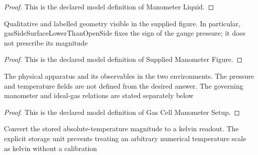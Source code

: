 \begin{proof}
  This is the declared model definition of Manometer Liquid.
\end{proof}
\begin{definition}
  \label{def:physics:phyx-mini-0365:phyxminiproblems-problemphyxmini0365-suppliedmanometerfigure}
  Qualitative and labelled geometry visible in the supplied figure. In particular, gasSideSurfaceLowerThanOpenSide fixes the sign of the gauge pressure; it does not prescribe its magnitude
\end{definition}
\begin{proof}
  This is the declared model definition of Supplied Manometer Figure.
\end{proof}
\begin{definition}
  \label{def:physics:phyx-mini-0365:phyxminiproblems-problemphyxmini0365-gascellmanometersetup}
  The physical apparatus and its observables in the two environments. The pressure and temperature fields are not defined from the desired answer. The governing manometer and ideal-gas relations are stated separately below
\end{definition}
\begin{proof}
  This is the declared model definition of Gas Cell Manometer Setup.
\end{proof}
\begin{definition}
  \label{def:physics:phyx-mini-0365:phyxminiproblems-problemphyxmini0365-temperatureinkelvin}
  Convert the stored absolute-temperature magnitude to a kelvin readout. The explicit storage unit prevents treating an arbitrary numerical temperature scale as kelvin without a calibration
\end{definition}

